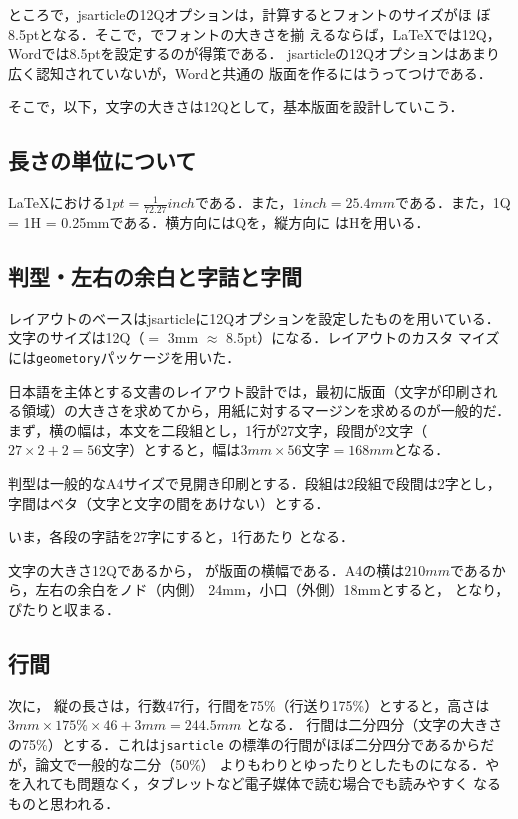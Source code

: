\documentclass[a4j, twocolumn, twoside, draft]{jsarticle}
\begin{document}
  ところで，jsarticleの12Qオプションは，計算するとフォントのサイズがほ
  ぼ8.5ptとなる．そこで，でフォントの大きさを揃
  えるならば，\LaTeX では12Q，Wordでは8.5ptを設定するのが得策である．
  jsarticleの12Qオプションはあまり広く認知されていないが，Wordと共通の
  版面を作るにはうってつけである．

  そこで，以下，文字の大きさは12Qとして，基本版面を設計していこう．

\subsection{長さの単位について}
  \LaTeX における$1 pt = \frac{1}{72.27} inch$である．また，$1 inch =
  25.4 mm$である．また，1Q = 1H = 0.25mmである．横方向にはQを，縦方向に
  はHを用いる．
\subsection{判型・左右の余白と字詰と字間}

レイアウトのベースはjsarticleに12Qオプションを設定したものを用いている．
文字のサイズは12Q（$=$ 3mm $\approx$ 8.5pt）になる．レイアウトのカスタ
マイズには\texttt{geometory}パッケージを用いた．

日本語を主体とする文書のレイアウト設計では，最初に版面（文字が印刷され
る領域）の大きさを求めてから，用紙に対するマージンを求めるのが一般的だ．
まず，横の幅は，本文を二段組とし，1行が27文字，段間が2文字（$27 \times
2 + 2 = 56$文字）とすると，幅は$3mm \times 56文字 = 168mm$となる．

  判型は一般的なA4サイズで見開き印刷とする．段組は2段組で段間は2字とし，
  字間はベタ（文字と文字の間をあけない）とする．

  いま，各段の字詰を27字にすると，1行あたり
\nlines{
  \[
   27字 + 2字 + 27字 = 56字
  \]
}
  となる．

  文字の大きさ12Qであるから，
\nlines{
  \[
   12Q \times 0.25 mm \times 56字 = 168 mm
  \]
}
  が版面の横幅である．A4の横は$210mm$であるから，左右の余白をノド（内側）
  24mm，小口（外側）18mmとすると，
\nlines{
  \[
   168mm + 24mm + 18mm = 210mm
  \]
}
  となり，ぴたりと収まる．

\subsection{行間}
次に，
縦の長さは，行数47行，行間を75\%（行送り175\%）とすると，高さは$3mm
\times 175\% \times 46 + 3mm = 244.5mm$ となる．
  行間は二分四分（文字の大きさの75\%）とする．これは\texttt{jsarticle}
  の標準の行間がほぼ二分四分であるからだが，論文で一般的な二分（50\%）
  よりもわりとゆったりとしたものになる．やを入れても問題なく，タブレットなど電子媒体で読む場合でも読みやすく
  なるものと思われる．
\end{document}
